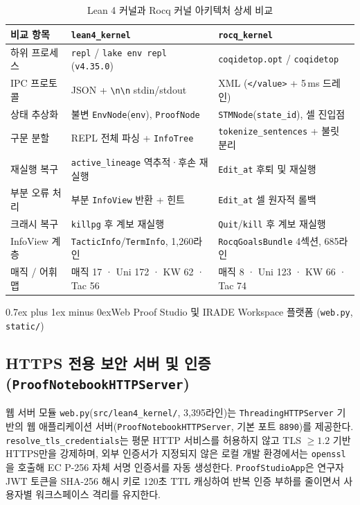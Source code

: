 \documentclass[journal]{IEEEtran}
\makeatletter
\def\section{\@startsection{section}{1}{\z@}{1.5ex plus 1.5ex minus 0.5ex}%
  {0.7ex plus 1ex minus 0ex}{\normalfont\normalsize\centering\bfseries}}%
\newcommand{\code}[1]{\texttt{#1}}
\makeatother
\begin{document}
\begin{table}[!t]
\caption{Lean 4 커널과 Rocq 커널 아키텍처 상세 비교}
\label{tab:lean_vs_rocq}
\centering
\scriptsize
\begin{tabularx}{\columnwidth}{@{}l X X@{}}
\toprule
\textbf{비교 항목} & \textbf{\code{lean4\_kernel}} & \textbf{\code{rocq\_kernel}} \\
\midrule
하위 프로세스 & \code{repl} / \code{lake env repl} (\code{v4.35.0}) & \code{coqidetop.opt} / \code{coqidetop} \\
IPC 프로토콜 & JSON + \code{\textbackslash n\textbackslash n} stdin/stdout & XML (\code{</value>} + 5\,ms 드레인) \\
상태 추상화 & 불변 \code{EnvNode}(\code{env}), \code{ProofNode} & \code{STMNode}(\code{state\_id}), 셀 진입점 \\
구문 분할 & REPL 전체 파싱 + \code{InfoTree} & \code{tokenize\_sentences} + 불릿 분리 \\
재실행 복구 & \code{active\_lineage} 역추적·후손 재실행 & \code{Edit\_at} 후퇴 및 재실행 \\
부분 오류 처리 & 부분 \code{InfoView} 반환 + 힌트 & \code{Edit\_at} 셀 원자적 롤백 \\
크래시 복구 & \code{killpg} 후 계보 재실행 & \code{Quit}/\code{kill} 후 계보 재실행 \\
InfoView 계층 & \code{TacticInfo}/\code{TermInfo}, 1,260라인 & \code{RocqGoalsBundle} 4섹션, 685라인 \\
매직 / 어휘 맵 & 매직 17 · Uni 172 · KW 62 · Tac 56 & 매직 8 · Uni 123 · KW 66 · Tac 74 \\
\bottomrule
\end{tabularx}
\end{table}

\section{Web Proof Studio 및 IRADE Workspace 플랫폼 (\code{web.py}, \code{static/})}

\subsection{HTTPS 전용 보안 서버 및 인증 (\code{ProofNotebookHTTPServer})}
웹 서버 모듈 \code{web.py}(\code{src/\allowbreak lean4\_kernel/}, 3,395라인)는 \code{Threading\-HTTP\-Server} 기반의 웹 애플리케이션 서버(\code{Proof\-Notebook\-HTTP\-Server}, 기본 포트 \code{8890})를 제공한다. \code{resolve\_tls\_credentials}는 평문 HTTP 서비스를 허용하지 않고 TLS $\ge 1.2$ 기반 HTTPS만을 강제하며, 외부 인증서가 지정되지 않은 로컬 개발 환경에서는 \code{openssl}을 호출해 EC P-256 자체 서명 인증서를 자동 생성한다. \code{ProofStudioApp}은 연구자 JWT 토큰을 SHA-256 해시 키로 120초 TTL 캐싱하여 반복 인증 부하를 줄이면서 사용자별 워크스페이스 격리를 유지한다.
\end{document}
